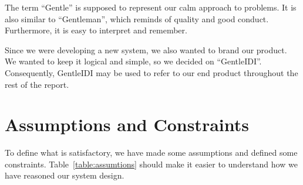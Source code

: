 The term ``Gentle'' is supposed to
represent our calm approach to problems. It is also similar to
``Gentleman'', which reminds of quality and good conduct. Furthermore, it is
easy to interpret and remember.

Since we were developing a new system, we also wanted to brand our product. We
wanted to keep it logical and simple, so we decided on ``GentleIDI''.
Consequently, GentleIDI may be used to refer to our end product throughout the
rest of the report.


\section{Assumptions and Constraints}
\label{sec:assumtions}
To define what is satisfactory, we have made some assumptions and
defined some constraints. Table~\ref{table:assumtions} should make it easier to
understand how we have reasoned our system design. 


